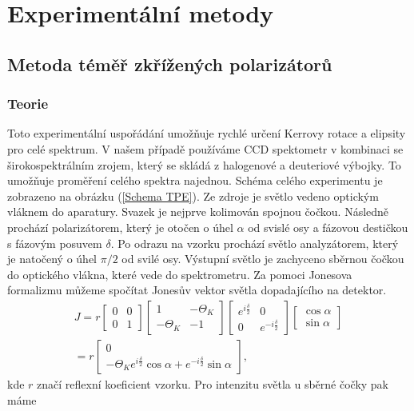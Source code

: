 \chapter{Experimentální metody}

\section{Metoda téměř zkřížených polarizátorů}
\subsection{Teorie}
Toto experimentální uspořádání umožňuje rychlé určení Kerrovy rotace a elipsity pro celé spektrum. V našem případě používáme CCD spektometr v kombinaci se širokospektrálním zrojem, který se skládá z halogenové a deuteriové výbojky. To umožňuje proměření celého spektra najednou. Schéma celého experimentu je zobrazeno na obrázku (\ref{Schema TPE}). Ze zdroje je světlo vedeno optickým vláknem do aparatury. Svazek je nejprve kolimován spojnou čočkou. Následně prochází polarizátorem, který je otočen o úhel $\alpha$ od svislé osy a fázovou destičkou s fázovým posuvem $\delta$. Po odrazu na vzorku prochází světlo analyzátorem, který je natočený o úhel $\pi/2$ od svilé osy. Výstupní světlo je zachyceno sběrnou čočkou do optického vlákna, které vede do spektrometru. Za pomoci Jonesova formalizmu můžeme spočítat Jonesův vektor světla dopadajícího na detektor.
\begin{eqnarray}
J=r\begin{bmatrix}0&0\\0&1\end{bmatrix}\begin{bmatrix}1&-\Theta_K\\-\Theta_K&-1\end{bmatrix}\begin{bmatrix}e^{i\frac{\delta}{2}}&0\\0&e^{-i\frac{\delta}{2}}\end{bmatrix}\begin{bmatrix}\cos\alpha\\\sin\alpha\end{bmatrix}\\
=r\begin{bmatrix}0\\-\Theta_Ke^{i\frac{\delta}{2}}\cos\alpha+e^{-i\frac{\delta}{2}}\sin\alpha\end{bmatrix},
\end{eqnarray}
kde $r$ značí reflexní koeficient vzorku. Pro intenzitu světla u sběrné čočky pak máme
